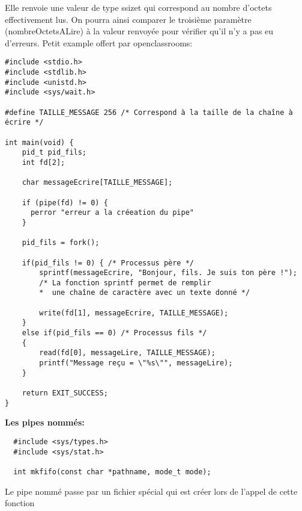 \documentclass[a4paper]{article}
\begin{document}
Elle renvoie une valeur de type ssize\textunderscore{}t qui correspond au nombre d'octets effectivement lus. On pourra ainsi comparer le troisième paramètre (nombreOctetsALire) à la valeur renvoyée pour vérifier qu'il n'y a pas eu d'erreurs.\newpage
Petit example offert par openclassrooms:
\begin{lstlisting}
#include <stdio.h>
#include <stdlib.h>
#include <unistd.h>
#include <sys/wait.h>

#define TAILLE_MESSAGE 256 /* Correspond à la taille de la chaîne à écrire */

int main(void) {
    pid_t pid_fils;
    int fd[2];

    char messageEcrire[TAILLE_MESSAGE];

    if (pipe(fd) != 0) {
      perror "erreur a la créeation du pipe"
    }

    pid_fils = fork();

    if(pid_fils != 0) { /* Processus père */
        sprintf(messageEcrire, "Bonjour, fils. Je suis ton père !");
        /* La fonction sprintf permet de remplir
        *  une chaîne de caractère avec un texte donné */

        write(fd[1], messageEcrire, TAILLE_MESSAGE);
    }
    else if(pid_fils == 0) /* Processus fils */
    {
        read(fd[0], messageLire, TAILLE_MESSAGE);
        printf("Message reçu = \"%s\"", messageLire);
    }

    return EXIT_SUCCESS;
}
\end{lstlisting}
\textbf{Les pipes nommés:}
\begin{lstlisting}
  #include <sys/types.h>
  #include <sys/stat.h>
  
  int mkfifo(const char *pathname, mode_t mode);
\end{lstlisting}
Le pipe nommé passe par un fichier spécial qui est créer lors de l'appel de cette fonction
\end{document}
